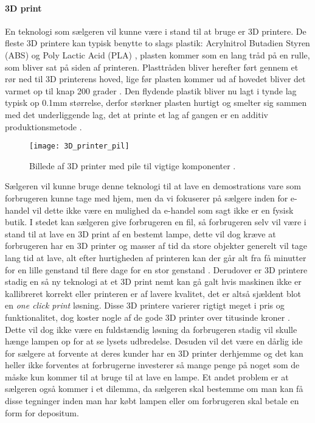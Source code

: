 \paragraph{3D print}
En teknologi som sælgeren vil kunne være i stand til at bruge er 3D printere. De fleste 3D printere kan typisk benytte to slags plastik: Acrylnitrol Butadien Styren (ABS) \cite{hvordan_3Dprinter} og Poly Lactic Acid (PLA) \cite{hvordan_3Dprinter}, plasten kommer som en lang tråd på en rulle, som bliver sat på siden af printeren. Plasttråden bliver herefter ført gennem et rør ned til 3D printerens hoved, lige før plasten kommer ud af hovedet bliver det varmet op til knap 200 grader \cite{hvordan_3Dprinter}. Den flydende plastik bliver nu lagt i tynde lag typisk op 0.1mm størrelse, derfor størkner plasten hurtigt og smelter sig sammen med det underliggende lag, det at printe et lag af gangen er en additiv produktionsmetode \cite{additiv_produktion}. 
\begin{figure}[H]
   \centering
   \texttt{[image: 3D\_printer\_pil]}
   \caption{Billede af 3D printer med pile til vigtige komponenter \cite{3D_printer_amazon}.}
\end{figure}
Sælgeren vil kunne bruge denne teknologi til at lave en demostrations vare som forbrugeren kunne tage med hjem, men da vi fokuserer på sælgere inden for e-handel vil dette ikke være en mulighed da e-handel som sagt ikke er en fysisk butik. I stedet kan sælgeren give forbrugeren en fil, så forbrugeren selv vil være i stand til at lave en 3D print af en bestemt lampe, dette vil dog kræve at forbrugeren har en 3D printer og masser af tid da store objekter generelt vil tage lang tid at lave, alt efter hurtigheden af printeren kan der går alt fra få minutter for en lille genstand til flere dage for en stor genstand \cite{hvordan_3Dprinter}. Derudover er 3D printere stadig en så ny teknologi at et 3D print nemt kan gå galt hvis maskinen ikke er kallibreret korrekt eller printeren er af lavere kvalitet, det er altså sjældent blot en \textit{one click print} løsning. Disse 3D printere varierer rigtigt meget i pris og funktionalitet, dog koster nogle af de gode 3D printer over titusinde kroner \cite{3D_printer}. 
\newline Dette vil dog ikke være en fuldstændig løsning da forbrugeren stadig vil skulle hænge lampen op for at se lysets udbredelse. Desuden vil det være en dårlig ide for sælgere at forvente at deres kunder har en 3D printer derhjemme og det kan heller ikke forventes at forbrugerne investerer så mange penge på noget som de måske kun kommer til at bruge til at lave en lampe. Et andet problem er at sælgeren også kommer i et dilemma, da sælgeren skal bestemme om man kan få disse tegninger inden man har købt lampen eller om forbrugeren skal betale en form for depositum.

